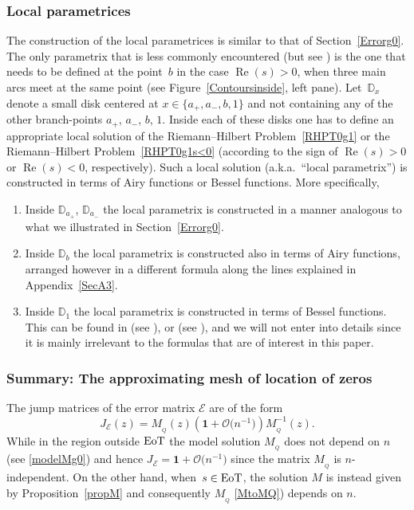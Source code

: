 \documentclass[10pt,a4paper]{amsart}
\numberwithin{equation}{section}
\theoremstyle{definition}
\def \scr{\mathscr}
\def \DD{\mathbb D}
\def\le{\left}
\def\ri{\right}
\def \1{\mathbf 1}
\def \Re{\operatorname{Re} }
\begin{document}
\subsubsection{Local parametrices}
\label{paramg1}
The construction of the local parametrices is similar to that of Section~\ref{Errorg0}. The only parametrix that is less commonly encountered (but see \cite{BertolaAdvances}) is the one that needs to be defined at the point~$b$ in the case $\Re (s)>0$, when three main arcs meet at the same point (see Figure~\ref{Contoursinside}, left pane).
Let~$\DD_x$ denote a small disk centered at $x\in\{a_+,a_-, b,1\}$ and not containing any of the other branch-points $a_+$, $a_-$, $b$, $1$. Inside each of these disks one has to define an appropriate local solution of the Riemann--Hilbert Problem~\ref{RHPT0g1} or the Riemann--Hilbert Problem~\ref{RHPT0g1s<0} (according to the sign of $\Re(s)>0$ or $\Re(s)<0$, respectively).
Such a local solution (a.k.a.\ ``local parametrix'') is constructed in terms of Airy functions or Bessel functions. More specifically,
\begin{enumerate}\itemsep=0pt
\item[(1)] Inside $\mathbb D_{a_+}$, $\mathbb D_{a_-}$ the local parametrix is constructed in a manner analogous to what we illustrated in Section~\ref{Errorg0}.
\item[(2)] Inside $\mathbb D_{b}$ the local parametrix is constructed also in terms of Airy functions, arranged however in a different formula along the lines explained in Appendix~\ref{SecA3}.
\item[(3)] Inside $\mathbb D_1$ the local parametrix is constructed in terms of Bessel functions. This can be found in (see \cite[Section~3, p.~155--156]{VanlessenStrong}), or (see \cite[Section~4.2]{BertoKatTov}), and we will not enter into details since it is mainly irrelevant to the formulas that are of interest in this paper.
\end{enumerate}

 \subsubsection{Summary: The approximating mesh of location of zeros}
 \label{summary}
 The jump matrices of the error matrix $\scr E$ are of the form
 \[
 J_{\scr E}(z) =M_{_Q}(z) \le(\1 + \mathcal O\bigl(n^{-1}\bigr)\ri) M_{_Q}^{-1}(z). \label{JE}
 \]
 While in the region outside ${\rm EoT}$ the model solution $M_{_Q}$ does not depend on $n$ (see \eqref{modelMg0}) and hence $J_{\scr E} = \1 + \mathcal O\bigl(n^{-1}\bigr)$ since the matrix $M_{_Q}$ is $n$-independent. On the other hand, when~${s\in {\rm EoT}}$, the solution $M$ is instead given by Proposition~\ref{propM} and consequently $M_{_Q}$ \eqref{MtoMQ}) depends on $n$.
\end{document}
